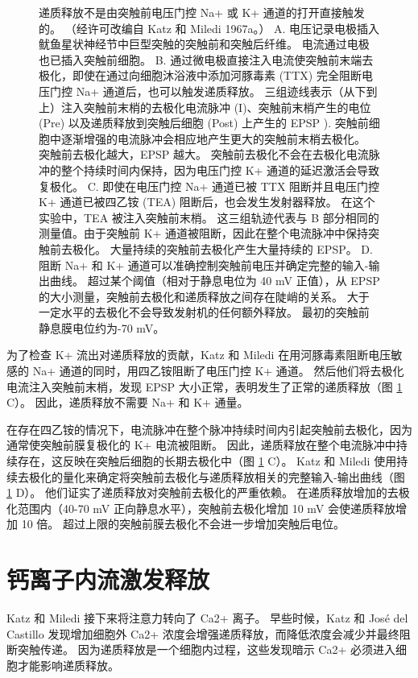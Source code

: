 \begin{figure}[htbp]
	\caption{递质释放不是由突触前电压门控 Na+ 或 K+ 通道的打开直接触发的。 （经许可改编自 Katz 和 Miledi 1967a。） A. 电压记录电极插入鱿鱼星状神经节中巨型突触的突触前和突触后纤维。 电流通过电极也已插入突触前细胞。 B. 通过微电极直接注入电流使突触前末端去极化，即使在通过向细胞沐浴液中添加河豚毒素 (TTX) 完全阻断电压门控 Na+ 通道后，也可以触发递质释放。 三组迹线表示（从下到上）注入突触前末梢的去极化电流脉冲 (I)、突触前末梢产生的电位 (Pre) 以及递质释放到突触后细胞 (Post) 上产生的 EPSP ). 突触前细胞中逐渐增强的电流脉冲会相应地产生更大的突触前末梢去极化。 突触前去极化越大，EPSP 越大。 突触前去极化不会在去极化电流脉冲的整个持续时间内保持，因为电压门控 K+ 通道的延迟激活会导致复极化。 C. 即使在电压门控 Na+ 通道已被 TTX 阻断并且电压门控 K+ 通道已被四乙铵 (TEA) 阻断后，也会发生发射器释放。 在这个实验中，TEA 被注入突触前末梢。 这三组轨迹代表与 B 部分相同的测量值。由于突触前 K+ 通道被阻断，因此在整个电流脉冲中保持突触前去极化。 大量持续的突触前去极化产生大量持续的 EPSP。 D. 阻断 Na+ 和 K+ 通道可以准确控制突触前电压并确定完整的输入-输出曲线。 超过某个阈值（相对于静息电位为 40 mV 正值），从 EPSP 的大小测量，突触前去极化和递质释放之间存在陡峭的关系。 大于一定水平的去极化不会导致发射机的任何额外释放。 最初的突触前静息膜电位约为-70 mV。}
	\label{fig:15_2}
\end{figure}


为了检查 K+ 流出对递质释放的贡献，Katz 和 Miledi 在用河豚毒素阻断电压敏感的 Na+ 通道的同时，用四乙铵阻断了电压门控 K+ 通道。 
然后他们将去极化电流注入突触前末梢，发现 EPSP 大小正常，表明发生了正常的递质释放（图 \ref{fig:15_2} C）。 
因此，递质释放不需要 Na+ 和 K+ 通量。


在存在四乙铵的情况下，电流脉冲在整个脉冲持续时间内引起突触前去极化，因为通常使突触前膜复极化的 K+ 电流被阻断。 
因此，递质释放在整个电流脉冲中持续存在，这反映在突触后细胞的长期去极化中（图 \ref{fig:15_2} C）。 
Katz 和 Miledi 使用持续去极化的量化来确定将突触前去极化与递质释放相关的完整输入-输出曲线（图 \ref{fig:15_2} D）。 
他们证实了递质释放对突触前去极化的严重依赖。 在递质释放增加的去极化范围内（40-70 mV 正向静息水平），突触前去极化增加 10 mV 会使递质释放增加 10 倍。 
超过上限的突触前膜去极化不会进一步增加突触后电位。


\section{钙离子内流激发释放}
Katz 和 Miledi 接下来将注意力转向了 Ca2+ 离子。 
早些时候，Katz 和 José del Castillo 发现增加细胞外 Ca2+ 浓度会增强递质释放，而降低浓度会减少并最终阻断突触传递。 
因为递质释放是一个细胞内过程，这些发现暗示 Ca2+ 必须进入细胞才能影响递质释放。


